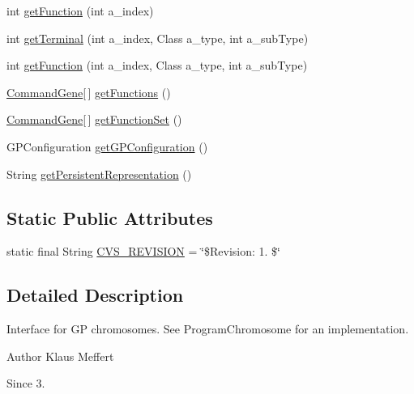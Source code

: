 \begin{DoxyCompactItemize}
\item 
int \hyperlink{interfaceorg_1_1jgap_1_1gp_1_1_i_g_p_chromosome_a76a7d9f2310e31bb9509bbd6ddc6c41d}{get\-Function} (int a\-\_\-index)
\item 
int \hyperlink{interfaceorg_1_1jgap_1_1gp_1_1_i_g_p_chromosome_a25bde73c597bf33feb35232ee32ee52d}{get\-Terminal} (int a\-\_\-index, Class a\-\_\-type, int a\-\_\-sub\-Type)
\item 
int \hyperlink{interfaceorg_1_1jgap_1_1gp_1_1_i_g_p_chromosome_a177b13dc67dda26fa8056598207706ae}{get\-Function} (int a\-\_\-index, Class a\-\_\-type, int a\-\_\-sub\-Type)
\item 
\hyperlink{classorg_1_1jgap_1_1gp_1_1_command_gene}{Command\-Gene}\mbox{[}$\,$\mbox{]} \hyperlink{interfaceorg_1_1jgap_1_1gp_1_1_i_g_p_chromosome_ad7a5cd77b01e717993466858667604ce}{get\-Functions} ()
\item 
\hyperlink{classorg_1_1jgap_1_1gp_1_1_command_gene}{Command\-Gene}\mbox{[}$\,$\mbox{]} \hyperlink{interfaceorg_1_1jgap_1_1gp_1_1_i_g_p_chromosome_a340247497b10eadfc097435d5a87b24d}{get\-Function\-Set} ()
\item 
G\-P\-Configuration \hyperlink{interfaceorg_1_1jgap_1_1gp_1_1_i_g_p_chromosome_a71916348b8ae9397bb30c26d92e616a6}{get\-G\-P\-Configuration} ()
\item 
String \hyperlink{interfaceorg_1_1jgap_1_1gp_1_1_i_g_p_chromosome_a7fb40e0daa789a54d1a8b3c9488aa60f}{get\-Persistent\-Representation} ()
\end{DoxyCompactItemize}
\subsection*{Static Public Attributes}
\begin{DoxyCompactItemize}
\item 
static final String \hyperlink{interfaceorg_1_1jgap_1_1gp_1_1_i_g_p_chromosome_a81a454d1fba54dbb9fb0850143e65484}{C\-V\-S\-\_\-\-R\-E\-V\-I\-S\-I\-O\-N} = \char`\"{}\$Revision\-: 1. \$\char`\"{}
\end{DoxyCompactItemize}


\subsection{Detailed Description}
Interface for G\-P chromosomes. See Program\-Chromosome for an implementation.

\begin{DoxyAuthor}{Author}
Klaus Meffert 
\end{DoxyAuthor}
\begin{DoxySince}{Since}
3. 
\end{DoxySince}


